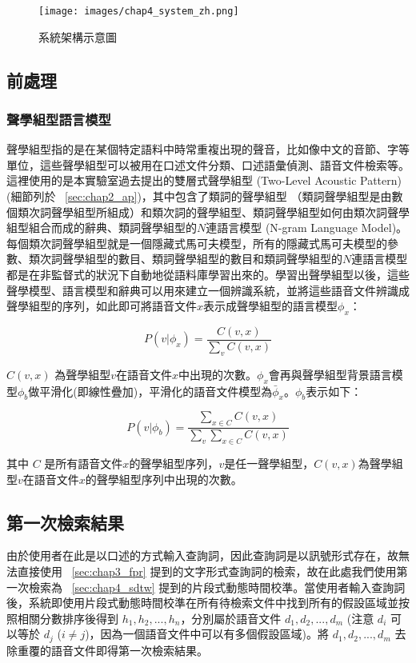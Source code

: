 \begin{figure}
\centering
\texttt{[image: images/chap4\_system\_zh.png]}
\caption{系統架構示意圖} \label{fig:chap4_system}
\end{figure}

\subsection{前處理}
\subsubsection{聲學組型語言模型}
\label{sec:chap3_apd}
聲學組型指的是在某個特定語料中時常重複出現的聲音，比如像中文的音節、字等單位，這些聲學組型可以被用在口述文件分類、口述語彙偵測、語音文件檢索等。這裡使用的是本實驗室過去提出的雙層式聲學組型 (Two-Level Acoustic Pattern)~\cite{chung2013unsupervised} (細節列於 ~\ref{sec:chap2_ap})，其中包含了類詞的聲學組型 （類詞聲學組型是由數個類次詞聲學組型所組成）和類次詞的聲學組型、類詞聲學組型如何由類次詞聲學組型組合而成的辭典、類詞聲學組型的$N$連語言模型 (N-gram Language
Model)。每個類次詞聲學組型就是一個隱藏式馬可夫模型，所有的隱藏式馬可夫模型的參數、類次詞聲學組型的數目、類詞聲學組型的數目和類詞聲學組型的$N$連語言模型都是在非監督式的狀況下自動地從語料庫學習出來的。學習出聲學組型以後，這些聲學模型、語言模型和辭典可以用來建立一個辨識系統，並將這些語音文件辨識成聲學組型的序列，如此即可將語音文件$x$表示成聲學組型的語言模型$\phi_x$：

\begin{equation}
P(v|\phi_x) = \frac{C(v, x)}{\sum_v C(v, x)}
\end{equation}

$C(v, x)$ 為聲學組型$v$在語音文件$x$中出現的次數。$\phi_x$會再與聲學組型背景語言模型$\phi_b$做平滑化(即線性疊加)，平滑化的語音文件模型為$\bar{\phi}_x$。$\phi_b$表示如下：

\begin{equation}
P(v|\phi_b) = \frac{\sum_{x\in C} C(v, x)}{\sum_v\sum_{x\in C} C(v, x)}
\end{equation}

其中 $C$ 是所有語音文件$x$的聲學組型序列，$v$是任一聲學組型，$C(v, x)$為聲學組型$v$在語音文件$x$的聲學組型序列中出現的次數。

\subsection{第一次檢索結果}
由於使用者在此是以口述的方式輸入查詢詞，因此查詢詞是以訊號形式存在，故無法直接使用 ~\ref{sec:chap3_fpr} 提到的文字形式查詢詞的檢索，故在此處我們使用第一次檢索為 ~\ref{sec:chap4_sdtw} 提到的片段式動態時間校準。當使用者輸入查詢詞後，系統即使用片段式動態時間校準在所有待檢索文件中找到所有的假設區域並按照相關分數排序後得到 $h_1, h_2, ...,h_n$，分別屬於語音文件 $d_1, d_2, ..., d_m$ (注意 $d_i$ 可以等於 $d_j$ ($i \neq j$)，因為一個語音文件中可以有多個假設區域)。將 $d_1, d_2, ..., d_m$ 去除重覆的語音文件即得第一次檢索結果。

